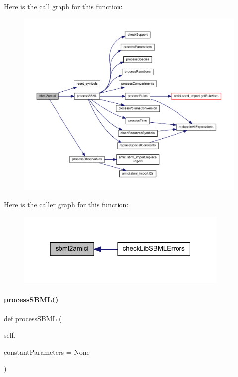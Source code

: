 Here is the call graph for this function\+:
\nopagebreak
\begin{figure}[H]
\begin{center}
\leavevmode
\includegraphics[width=350pt]{classamici_1_1sbml__import_1_1_sbml_importer_ae5cdd2444bac89e61e6f717f7736acb6_cgraph}
\end{center}
\end{figure}
Here is the caller graph for this function\+:
\nopagebreak
\begin{figure}[H]
\begin{center}
\leavevmode
\includegraphics[width=292pt]{classamici_1_1sbml__import_1_1_sbml_importer_ae5cdd2444bac89e61e6f717f7736acb6_icgraph}
\end{center}
\end{figure}
\mbox{\label{classamici_1_1sbml__import_1_1_sbml_importer_ac188693ab1d9fc500d55748dbde9bf89}} 
\paragraph{\texorpdfstring{process\+S\+B\+M\+L()}{processSBML()}}
{\footnotesize\ttfamily def process\+S\+B\+ML (\begin{DoxyParamCaption}\item[{}]{self,  }\item[{}]{constant\+Parameters = {\ttfamily None} }\end{DoxyParamCaption})}


